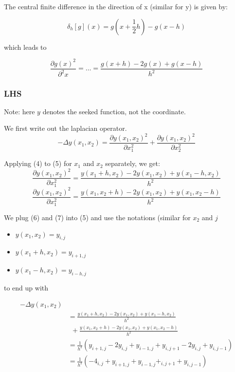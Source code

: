 \documentclass[unicode,11pt,a4paper,oneside,numbers=endperiod,openany]{scrartcl}
\begin{document}
The central finite difference in the direction of x (similar for y) is given by:

\begin{equation}
  \delta_h [g](x) = g(x+\frac{1}{2}h) - g(x-h)
\end{equation}

which leads to

\begin{equation}
  \frac{\partial g(x)^2}{\partial^2 x} = \dots = 
    \frac{g(x + h) - 2g(x) + g(x - h)}{h^2}
\end{equation}

\subsubsection{LHS}

Note: here $y$ denotes the seeked function, not the coordinate.

We first write out the laplacian operator.
\begin{equation}
  -\Delta y(x_1, x_2) = \frac{\partial y(x_1, x_2)^2}{\partial x_1^2} 
                      + \frac{\partial y(x_1, x_2)^2}{\partial x_2^2}
\end{equation}

Applying (4) to (5) for $x_1$ and $x_2$ separately, we get:
\begin{equation}
  \frac{\partial y(x_1, x_2)^2}{\partial x_1^2} = 
    \frac{y(x_1 + h, x_2) - 2y(x_1, x_2) + y(x_1 - h, x_2)}{h^2}
\end{equation}
\begin{equation}
  \frac{\partial y(x_1, x_2)^2}{\partial x_1^2} = 
    \frac{y(x_1, x_2 + h) - 2y(x_1, x_2) + y(x_1, x_2 - h)}{h^2}
\end{equation}

We plug (6) and (7) into (5) and use the notations (similar for $x_2$ and $j$
\begin{itemize}
  \item $y(x_1, x_2) = y_{i,j}$
  \item $y(x_1 + h, x_2) = y_{i+1, j}$
  \item $y(x_1 - h, x_2) = y_{i-h, j}$
\end{itemize}

to end up with

\begin{align}
  -\Delta y(x_1,x_2) & \\
                     &= \frac{y(x_1 + h, x_2) - 2y(x_1, x_2) + y(x_1 - h, x_2)}{h^2} \\
                     &\ \ + \frac{y(x_1, x_2 + h) - 2y(x_1, x_2) + y(x_1, x_2 - h)}{h^2} \\
                   &= \frac{1}{h^2} ( y_{i+1,j} - 2y_{i,j} + y_{i-1,j}
                      + y_{i, j+1} - 2y_{i,j} + y_{i,j-1}) \\
                   &= \frac{1}{h^2} ( -4_{i,j} + y_{i+1,j} + y_{i-1,j}
                      + _{i, j+1} + y_{i,j-1} )
\end{align}
\end{document}
